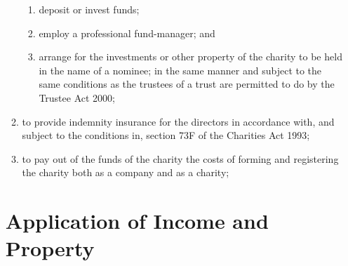 \begin{enumerate}
\begin{enumerate}
\begin{enumerate}
    \item
      deposit or invest funds;
    \item
      employ a professional fund-manager; and
    \item
      arrange for the investments or other property of the charity to be
      held in the name of a nominee; in the same manner and subject to
      the same conditions as the trustees of a trust are permitted to do
      by the Trustee Act 2000;
    \end{enumerate}
  \item
    to provide indemnity insurance for the directors in accordance
    with, and subject to the conditions in, section 73F of the
    Charities Act 1993;
  \item
    to pay out of the funds of the charity the costs of forming and
    registering the charity both as a company and as a charity;
  \end{enumerate}

\section{Application of Income and Property}


\end{enumerate}
